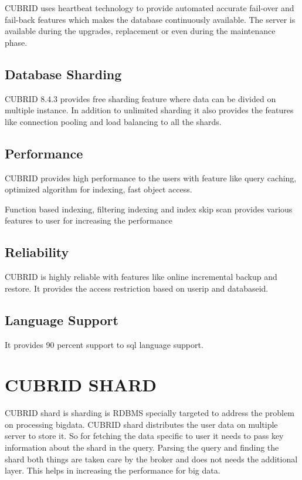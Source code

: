 \documentclass[9pt,twocolumn,twoside]{styles/osajnl}
\begin{document}
CUBRID uses heartbeat technology to
provide automated accurate fail-over and fail-back features which
makes the database continuously available. The server is available
during the upgrades, replacement or even during the maintenance phase.

\subsection{Database Sharding}

CUBRID 8.4.3 provides free sharding feature where data can be divided
on multiple instance.  In addition to unlimited sharding it also
provides the features like connection pooling and load balancing to
all the shards.

\subsection{Performance}

CUBRID provides high performance to the users with feature like query
caching, optimized algorithm for indexing, fast object access.

Function based indexing, filtering indexing and index skip scan
provides various features to user for increasing the performance

\subsection{Reliability}

CUBRID is highly reliable with features like online incremental backup
and restore.  It provides the access restriction based on userip and
databaseid.

\subsection{Language Support}
It provides 90 percent support to sql language support. 


\section{CUBRID SHARD}

CUBRID shard is sharding is RDBMS specially targeted to address the
problem on processing bigdata. CUBRID shard distributes the user data
on multiple server to store it. So for fetching the data specific to
user it needs to pass key information about the shard in the
query. Parsing the query and finding the shard both things are taken
care by the broker and does not needs the additional layer. This helps
in increasing the performance for big data. 
\end{document}

